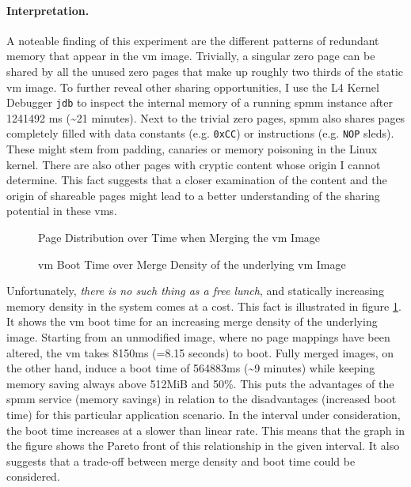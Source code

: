 \paragraph{Interpretation.}

A noteable finding of this experiment are the different patterns of redundant memory that appear in the \ac{vm} image.
Trivially, a singular zero page can be shared by all the unused zero pages that make up roughly two thirds of the static \ac{vm} image.
To further reveal other sharing opportunities, I use the L4 Kernel Debugger \texttt{jdb} to inspect the internal memory of a running \ac{spmm} instance after 1241492 ms (\textasciitilde{}21 minutes).
Next to the trivial zero pages, \ac{spmm} also shares pages completely filled with data constants (e.g. \texttt{0xCC}) or instructions (e.g. \texttt{NOP} sleds).
These might stem from padding, canaries or memory poisoning in the Linux kernel.
There are also other pages with cryptic content whose origin I cannot determine.
This fact suggests that a closer examination of the content and the origin of shareable pages might lead to a better understanding of the sharing potential in these \acp{vm}.

\begin{figure}
  \centering
  
  \caption{Page Distribution over Time when Merging the \acs{vm} Image}
  \label{fig:page-distribution-vm}
  \centering
  
  \caption{\acs{vm} Boot Time over Merge Density of the underlying \acs{vm} Image}
  \label{fig:boot-time-vm}
\end{figure}

Unfortunately, \emph{there is no such thing as a free lunch}, and statically increasing memory density in the system comes at a cost.
This fact is illustrated in figure \ref{fig:boot-time-vm}.
It shows the \ac{vm} boot time for an increasing merge density of the underlying image.
Starting from an unmodified image, where no page mappings have been altered, the \ac{vm} takes 8150ms (=8.15 seconds) to boot.
Fully merged images, on the other hand, induce a boot time of 564883ms (\textasciitilde{}9 minutes) while keeping memory saving always above 512MiB and 50\%.
This puts the advantages of the \ac{spmm} service (memory savings) in relation to the disadvantages (increased boot time) for this particular application scenario.
In the interval under consideration, the boot time increases at a slower than linear rate.
This means that the graph in the figure shows the Pareto front of this relationship in the given interval.
It also suggests that a trade-off between merge density and boot time could be considered.

